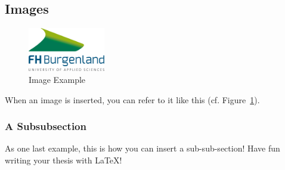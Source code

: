 \subsection{Images}

\begin{figure}[h]
	\centering
	\includegraphics[width=0.3\textwidth]{figures/logo_nontransparent.jpg}
	\caption{Image Example}
	\label{fig:image_example}
\end{figure}

When an image is inserted, you can refer to it like this (cf. Figure~\hyperref[fig:image_example]{\ref{fig:image_example}}).

\subsubsection{A Subsubsection}
As one last example, this is how you can insert a sub-sub-section! Have fun
writing your thesis with \LaTeX{}!

\lipsum[2-3]
\raggedbottom

\pagebreak

